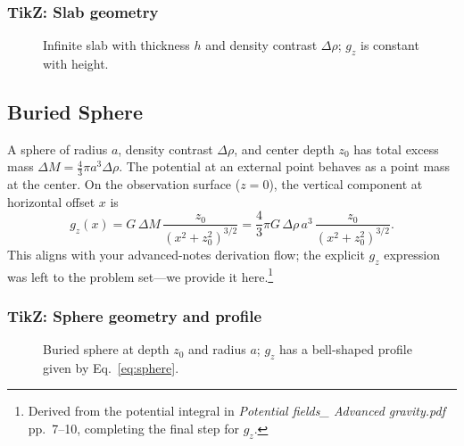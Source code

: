 \documentclass[11pt,a4paper]{article}
\begin{document}
\subsubsection*{TikZ: Slab geometry}
\begin{figure}[h]
\centering
{}
\caption{Infinite slab with thickness $h$ and density contrast $\Delta\rho$; $g_z$ is constant with height.}
\end{figure}

\subsection{Buried Sphere}
A sphere of radius $a$, density contrast $\Delta\rho$, and center depth $z_0$ has total excess mass $\Delta M = \tfrac{4}{3}\pi a^3\Delta\rho$. The potential at an external point behaves as a point mass at the center. On the observation surface ($z=0$), the vertical component at horizontal offset $x$ is
\begin{equation}
  g_z(x) = G\,\Delta M\,\frac{z_0}{(x^2+z_0^2)^{3/2}} = \frac{4}{3}\pi G\,\Delta\rho\,a^3\,\frac{z_0}{(x^2+z_0^2)^{3/2}}.\label{eq:sphere}
\end{equation}
This aligns with your advanced-notes derivation flow; the explicit $g_z$ expression was left to the problem set—we provide it here.\footnote{Derived from the potential integral in \emph{Potential fields\_ Advanced gravity.pdf} pp.~7--10, completing the final step for $g_z$.}

\subsubsection*{TikZ: Sphere geometry and profile}
\begin{figure}[h]
\centering
{}
\caption{Buried sphere at depth $z_0$ and radius $a$; $g_z$ has a bell-shaped profile given by Eq.~\eqref{eq:sphere}.}
\end{figure}
\end{document}
